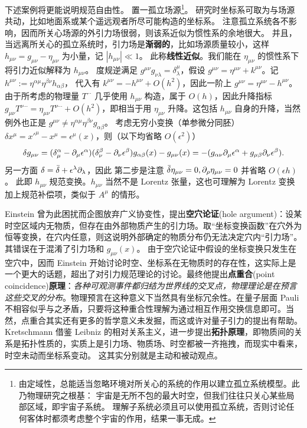 下述案例将更能说明规范自由性。
置一孤立场源\footnote{由定域性，总能适当忽略环境对所关心的系统的作用以建立孤立系统模型。此乃物理研究之根基：
宇宙是无所不包的最大时空，但我们往往只关心某些局部区域，即宇宙子系统。
理解子系统必须且可以使用孤立系统，否则讨论任何客体时都须考虑整个宇宙的作用，结果一事无成。}。
研究时坐标系可取为与场源共动，比如地面系或某个遥远观者所尽可能构造的坐标系。
注意孤立系统各不影响，因而所关心场源的外引力场很弱，则该系近似为惯性系的余地很大。
并且，当远离所关心的孤立系统时，引力场是\textbf{渐弱的}，比如场源质量较小，这样 $h_{\mu\nu}=g_{\mu\nu}-\eta_{\mu\nu}$ 为小量，记 $|h_{\mu\nu}|\ll 1$。
此称\textbf{线性近似}。我们能在 $\eta_{\mu\nu}$ 的惯性系下将引力近似解释为 $h_{\mu\nu}$。
度规逆满足 $g^{\mu\nu}g_{\nu\lambda}=\delta^\mu_\lambda$，假设 $g^{\mu\nu} = \eta^{\mu\nu} + k^{\mu\nu}$。记 $h^{\mu\nu} := \eta^{\alpha\mu}\eta^{\beta\nu}h_{\alpha\beta}$，
代入有 $k^{\mu\nu} = -h^{\mu\nu} + O(h^2)$，因此一阶上 $g^{\mu\nu} = \eta^{\mu\nu} - h^{\mu\nu}$。由于所考虑的物理量 $T^{\cdots}$ 几乎使用 $h_{\mu\nu}$ 构造，属于 $O(h)$，因此升降指标 $g_{\mu\nu} T^{\nu\cdots} = \eta_{\mu\nu} T^{\nu\cdots} + O(h^2)$，即相当于用 $\eta_{\mu\nu}$ 升降。这包括 $h_{\mu\nu}$ 自身的升降，当然例外也正是 $g^{\mu\nu} \ne \eta^{\alpha\mu}\eta^{\beta\nu}g_{\alpha\beta}$。
考虑无穷小变换（单参微分同胚） $\delta x^\mu=x'^\mu-x^\mu=\epsilon^\mu(x)$，则（以下均省略 $O(\epsilon^2)$）
\[\delta g_{\mu\nu} = (\delta^\alpha_\mu - \partial_\mu \epsilon^\alpha)(\delta^\beta_\nu - \partial_\nu \epsilon^\beta) g_{\alpha\beta}(x) - g_{\mu\nu}(x) = - (g_{\alpha\nu} \partial_\mu \epsilon^\alpha + g_{\mu\beta} \partial_\nu \epsilon^\beta).\]
另一方面 $\delta = \bar\var + \epsilon^\lambda\partial_\lambda$，因此
第二步是注意 $\bar\var\eta_{\mu\nu}=0,\partial_\rho \eta_{\mu\nu} = 0$ 并省略 $O(\epsilon h)$。
此即 $h_{\mu\nu}$ 规范变换。$h_{\mu\nu}$ 当然不是 Lorentz 张量，这也可理解为 Lorentz 变换加上规范补偿项，类似于 $A^\mu$ 的情形。

Einstein 曾为此困扰而企图放弃广义协变性，提出\textbf{空穴论证}(hole argument)：设某时空区域内无物质，但存在由外部物质产生的引力场。取“坐标变换函数”在穴外为恒等变换，在穴内任意，则这说明外部确定的物质分布仍无法决定穴内“引力场”。其错误在于混淆了引力场和 $g_{\mu\nu}(x)$。
由于空穴论证中假设的坐标变换只发生在空穴中，因而 Einstein 开始讨论时空、坐标系在无物质时的存在性，这实际上是一个更大的话题，超出了对引力规范理论的讨论。最终他提出\textbf{点重合}(point coincidence)\textbf{原理}：\textit{各种可观测事件都归结为世界线的交叉点，物理理论是在预言这些交叉的分布}。物理预言在这种意义下当然具有坐标冗余性。在量子层面 Pauli 不相容似乎与之矛盾，只要将这种重合性理解为通过相互作用交换信息即可。当然，点重合其实还有更多的哲学意义未发掘，而这或许对量子引力的提出有帮助。
Kretschmann 借鉴 Leibniz 的相对关系主义，进一步提出\textbf{拓扑原理}，即物质间的关系是拓扑性质的，实质上是引力场、物质场、时空都被一齐拖拽，而现实中看来，时空未动而坐标系变动。
这其实分别就是主动和被动观点。


